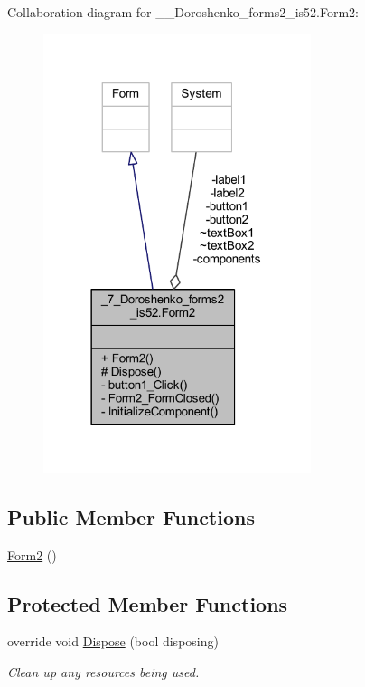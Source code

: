 Collaboration diagram for \+\_\+\_\+\+Doroshenko\+\_\+forms2\+\_\+is52.\+Form2\+:
\nopagebreak
\begin{figure}[H]
\begin{center}
\leavevmode
\includegraphics[width=222pt]{class__7___doroshenko__forms2__is52_1_1_form2__coll__graph}
\end{center}
\end{figure}
\subsection*{Public Member Functions}
\begin{DoxyCompactItemize}
\item 
\hyperlink{class__7___doroshenko__forms2__is52_1_1_form2_ad9bec3da2232afd6c01a52bcae6f18d0}{Form2} ()
\end{DoxyCompactItemize}
\subsection*{Protected Member Functions}
\begin{DoxyCompactItemize}
\item 
override void \hyperlink{class__7___doroshenko__forms2__is52_1_1_form2_a703263905c77adfc722a785b0a931826}{Dispose} (bool disposing)
\begin{DoxyCompactList}\small\item\em Clean up any resources being used. \end{DoxyCompactList}\end{DoxyCompactItemize}
